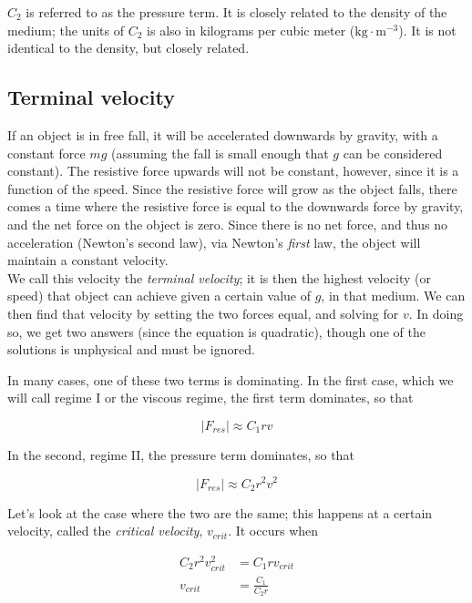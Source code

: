 $C_2$ is referred to as the pressure term. It is closely related to the density of the medium; the units of $C_2$ is also in kilograms per cubic meter ($\text{kg} \cdot \text{m}^{-3}$). It is not identical to the density, but closely related.

\subsection{Terminal velocity}

If an object is in free fall, it will be accelerated downwards by gravity, with a constant force $m g$ (assuming the fall is small enough that $g$ can be considered constant). The resistive force upwards will not be constant, however, since it is a function of the speed. Since the resistive force will grow as the object falls, there comes a time where the resistive force is equal to the downwards force by gravity, and the net force on the object is zero. Since there is no net force, and thus no acceleration (Newton's second law), via Newton's \emph{first} law, the object will maintain a constant velocity.\\
We call this velocity the \emph{terminal velocity}; it is then the highest velocity (or speed) that object can achieve given a certain value of $g$, in that medium. We can then find that velocity by setting the two forces equal, and solving for $v$. In doing so, we get two answers (since the equation is quadratic), though one of the solutions is unphysical and must be ignored.

In many cases, one of these two terms is dominating. In the first case, which we will call regime I or the viscous regime, the first term dominates, so that

\begin{equation}
|F_{res}| \approx C_1 r v
\end{equation}

In the second, regime II, the pressure term dominates, so that

\begin{equation}
|F_{res}| \approx C_2 r^2 v^2
\end{equation}

Let's look at the case where the two are the same; this happens at a certain velocity, called the \emph{critical velocity}, $v_{crit}$. It occurs when

\begin{align}
C_2 r^2 v_{crit}^2 &= C_1 r v_{crit}\\
v_{crit} &= \frac{C_1}{C_2 r}
\end{align}

